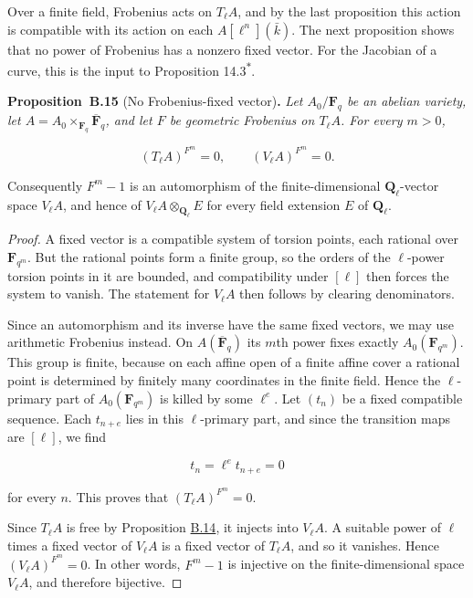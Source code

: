 \documentclass[11pt]{article}
\newenvironment{bpstatement}[2]{\par\addvspace{0.6\baselineskip}\noindent\textbf{#1}#2\textbf{.}\enspace\ignorespaces}
  {\par\addvspace{0.4\baselineskip}}
\newenvironment{bpstatementit}[2]{\begin{bpstatement}{#1}{#2}\itshape\ignorespaces}{\end{bpstatement}}
\newcommand{\bpout}[1]{#1\textsuperscript{\hyperlink{bp-outside}{\ensuremath{\ast}}}}
\begin{document}
\label{bp42}%
Over a finite field, Frobenius acts on \(T_\ell A\), and by the last proposition this action is compatible with its action on each \(A[\ell^n](\bar k)\). The next proposition shows that no power of Frobenius has a nonzero fixed vector. For the Jacobian of a curve, this is the input to Proposition \bpout{14.3}.

\label{bp43}%
\begin{bpstatementit}{Proposition~B.15}{ (No Frobenius-fixed vector)}
Let \(A_0/\mathbf F_q\) be an abelian variety, let \(A=A_0\times_{\mathbf F_q}\overline{\mathbf F}_q\), and let \(F\) be geometric Frobenius on \(T_\ell A\). For every \(m>0\),

\[
(T_\ell A)^{F^m}=0,
\qquad (V_\ell A)^{F^m}=0.
\]

Consequently \(F^m-1\) is an automorphism of the finite-dimensional \(\mathbf Q_\ell\)-vector space \(V_\ell A\), and hence of \(V_\ell A\otimes_{\mathbf Q_\ell}E\) for every field extension \(E\) of \(\mathbf Q_\ell\).
\end{bpstatementit}

\begin{proof}[{Proof}]\label{bp44}%
A fixed vector is a compatible system of torsion points, each rational over \(\mathbf F_{q^m}\). But the rational points form a finite group, so the orders of the \(\ell\)-power torsion points in it are bounded, and compatibility under \([\ell]\) then forces the system to vanish. The statement for \(V_\ell A\) then follows by clearing denominators.

Since an automorphism and its inverse have the same fixed vectors, we may use arithmetic Frobenius instead. On \(A(\overline{\mathbf F}_q)\) its \(m\)th power fixes exactly \(A_0(\mathbf F_{q^m})\). This group is finite, because on each affine open of a finite affine cover a rational point is determined by finitely many coordinates in the finite field. Hence the \(\ell\)-primary part of \(A_0(\mathbf F_{q^m})\) is killed by some \(\ell^e\). Let \((t_n)\) be a fixed compatible sequence. Each \(t_{n+e}\) lies in this \(\ell\)-primary part, and since the transition maps are \([\ell]\), we find

\[
t_n=\ell^e t_{n+e}=0
\]

for every \(n\). This proves that \((T_\ell A)^{F^m}=0\).

Since \(T_\ell A\) is free by Proposition \hyperref[bp40]{B.14}, it injects into \(V_\ell A\). A suitable power of \(\ell\) times a fixed vector of \(V_\ell A\) is a fixed vector of \(T_\ell A\), and so it vanishes. Hence \((V_\ell A)^{F^m}=0\). In other words, \(F^m-1\) is injective on the finite-dimensional space \(V_\ell A\), and therefore bijective.
\end{proof}
\end{document}
